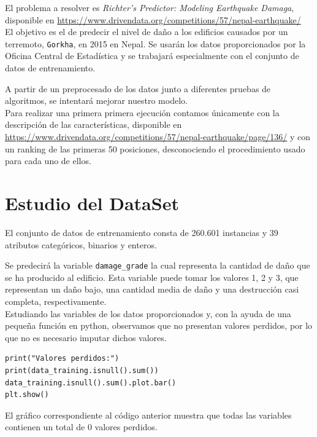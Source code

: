 	El problema a resolver es \textit{Richter's Predictor: Modeling Earthquake Damaga}, disponible en \url{https://www.drivendata.org/competitions/57/nepal-earthquake/} \\
	
	El objetivo es el de predecir el nivel de daño a los edificios causados por un terremoto, \texttt{Gorkha}, en 2015 en Nepal.  Se usarán los datos proporcionados por la Oficina Central de Estadística y se trabajará especialmente con el conjunto de datos de entrenamiento.
	 
	
	A partir de un preprocesado de los datos junto a diferentes pruebas de algoritmos, se intentará mejorar nuestro modelo. \\
	
	Para realizar una primera primera ejecución contamos únicamente con la descripción de las características, disponible en \url{https://www.drivendata.org/competitions/57/nepal-earthquake/page/136/} y con un ranking de las primeras 50 posiciones, desconociendo el procedimiento usado para cada uno de ellos.
	
	
	
	
	
	
	
	

\section{Estudio del DataSet}

\hspace{1.5cm} El conjunto de datos de entrenamiento consta de 260.601 instancias y 39 atributos categóricos, binarios y enteros. 

 Se predecirá la variable \texttt{damage\_grade} la cual representa la cantidad de daño que se ha producido al edificio. Esta variable puede tomar los valores 1, 2 y 3, que representan un daño bajo, una cantidad media de daño y una destrucción casi completa, respectivamente. \\


Estudiando las variables de los datos proporcionados y, con la ayuda de una pequeña función en python, observamos que no presentan valores perdidos, por lo que no es necesario imputar dichos valores. \\


\begin{lstlisting}[frame=single]
print("Valores perdidos:")
print(data_training.isnull().sum())
data_training.isnull().sum().plot.bar()
plt.show()
\end{lstlisting}
El gráfico correspondiente al código anterior muestra que todas las variables contienen un total de 0 valores perdidos. \\


